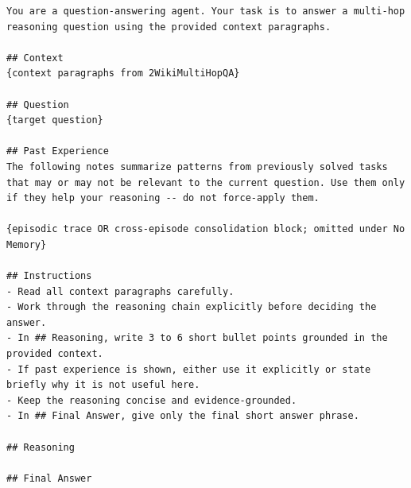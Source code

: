 \begin{lstlisting}
You are a question-answering agent. Your task is to answer a multi-hop reasoning question using the provided context paragraphs.

## Context
{context paragraphs from 2WikiMultiHopQA}

## Question
{target question}

## Past Experience
The following notes summarize patterns from previously solved tasks that may or may not be relevant to the current question. Use them only if they help your reasoning -- do not force-apply them.

{episodic trace OR cross-episode consolidation block; omitted under No Memory}

## Instructions
- Read all context paragraphs carefully.
- Work through the reasoning chain explicitly before deciding the answer.
- In ## Reasoning, write 3 to 6 short bullet points grounded in the provided context.
- If past experience is shown, either use it explicitly or state briefly why it is not useful here.
- Keep the reasoning concise and evidence-grounded.
- In ## Final Answer, give only the final short answer phrase.

## Reasoning

## Final Answer
\end{lstlisting}
